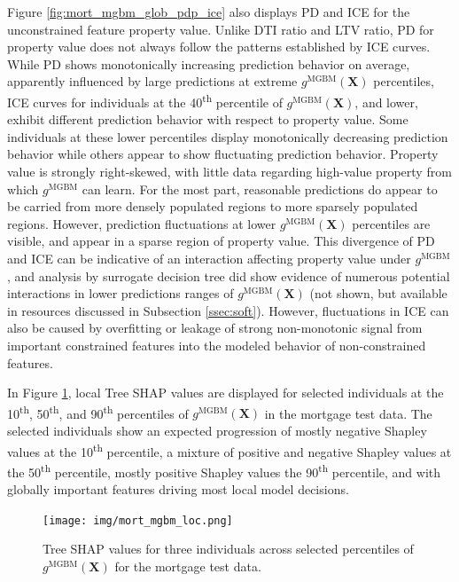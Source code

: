 \documentclass[information,article,submit,moreauthors,pdftex]{definitions/mdpi}
\begin{document}
Figure \ref{fig:mort_mgbm_glob_pdp_ice} also displays PD and ICE for the unconstrained feature property value. Unlike DTI ratio and LTV ratio, PD for property value does not always follow the patterns established by ICE curves. While PD shows monotonically increasing prediction behavior on average, apparently influenced by large predictions at extreme $g^{\text{MGBM}}(\mathbf{X})$ percentiles, ICE curves for individuals at the 40\textsuperscript{th} percentile of $g^{\text{MGBM}}(\mathbf{X})$, and lower,  exhibit different prediction behavior with respect to property value. Some individuals at these lower percentiles display monotonically decreasing prediction behavior while others appear to show fluctuating prediction behavior. Property value is strongly right-skewed, with little data regarding high-value property from which $g^{\text{MGBM}}$ can learn. For the most part, reasonable predictions do appear to be carried from more densely populated regions to more sparsely populated regions. However, prediction fluctuations at lower $g^{\text{MGBM}}(\mathbf{X})$ percentiles are visible, and appear in a sparse region of property value. This divergence of PD and ICE can be indicative of an interaction affecting property value under $g^{\text{MGBM}}$ \cite{ice_plots}, and analysis by surrogate decision tree did show evidence of numerous potential interactions in lower predictions ranges of $g^{\text{MGBM}}(\mathbf{X})$ \cite{art_and_sci} (not shown, but available in resources discussed in Subsection \ref{ssec:soft}). However, fluctuations in ICE can also be caused by overfitting or leakage of strong non-monotonic signal from important constrained features into the modeled behavior of non-constrained features. 

In Figure \ref{fig:mort_mgbm_loc}, local Tree SHAP values are displayed for selected individuals at the 10\textsuperscript{th}, 50\textsuperscript{th}, and 90\textsuperscript{th} percentiles of $g^{\text{MGBM}}(\mathbf{X})$ in the mortgage test data. The selected individuals show an expected progression of mostly negative Shapley values at the 10\textsuperscript{th} percentile, a mixture of positive and negative Shapley values at the 50\textsuperscript{th} percentile, mostly positive Shapley values the 90\textsuperscript{th} percentile, and with globally important features driving most local model decisions. 

\begin{figure}[H]
\centering
\texttt{[image: img/mort\_mgbm\_loc.png]}
\caption{Tree SHAP values for three individuals across selected percentiles of $g^\text{MGBM}(\mathbf{X})$ for the mortgage test data.}
\label{fig:mort_mgbm_loc}
\end{figure}   
\end{document}
